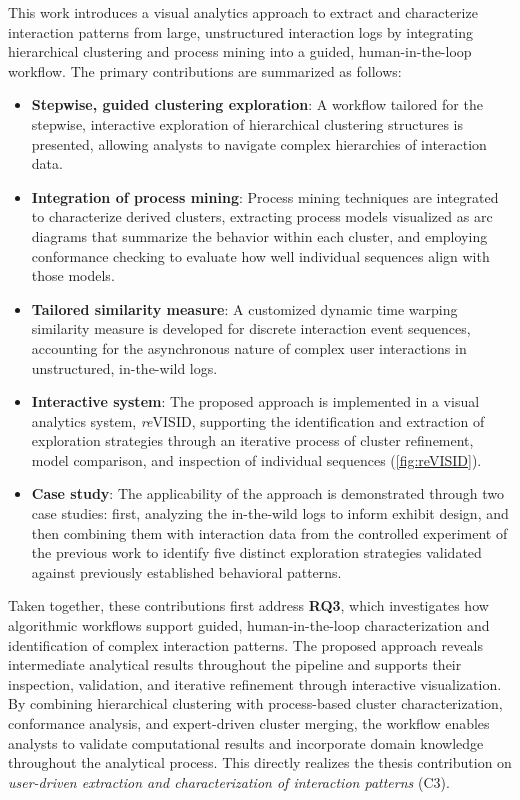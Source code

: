 This work introduces a visual analytics approach to extract and characterize interaction patterns from large, unstructured interaction logs by integrating hierarchical clustering and process mining into a guided, human-in-the-loop workflow.
The primary contributions are summarized as follows:
\begin{itemize}
    \item
    \textbf{Stepwise, guided clustering exploration}:
    A workflow tailored for the stepwise, interactive exploration of hierarchical clustering structures is presented, allowing analysts to navigate complex hierarchies of interaction data.

    \item
    \textbf{Integration of process mining}:
    Process mining techniques are integrated to characterize derived clusters, extracting process models visualized as arc diagrams that summarize the behavior within each cluster, and employing conformance checking to evaluate how well individual sequences align with those models.

    \item
    \textbf{Tailored similarity measure}:
    A customized dynamic time warping similarity measure is developed for discrete interaction event sequences, accounting for the asynchronous nature of complex user interactions in unstructured, in-the-wild logs.

    \item
    \textbf{Interactive system}:
    The proposed approach is implemented in a visual analytics system, \textit{re}\textsc{VISID}, supporting the identification and extraction of exploration strategies through an iterative process of cluster refinement, model comparison, and inspection of individual sequences (\cref{fig:reVISID}).

    \item
    \textbf{Case study}:
    The applicability of the approach is demonstrated through two case studies: first, analyzing the in-the-wild logs to inform exhibit design, and then combining them with interaction data from the controlled experiment of the previous work to identify five distinct exploration strategies validated against previously established behavioral patterns.
\end{itemize}

Taken together, these contributions first address \textbf{RQ3}, which investigates how algorithmic workflows support guided, human-in-the-loop characterization and identification of complex interaction patterns.
The proposed approach reveals intermediate analytical results throughout the pipeline and supports their inspection, validation, and iterative refinement through interactive visualization.
By combining hierarchical clustering with process-based cluster characterization, conformance analysis, and expert-driven cluster merging, the workflow enables analysts to validate computational results and incorporate domain knowledge throughout the analytical process.
This directly realizes the thesis contribution on \textit{user-driven extraction and characterization of interaction patterns} (C3).

